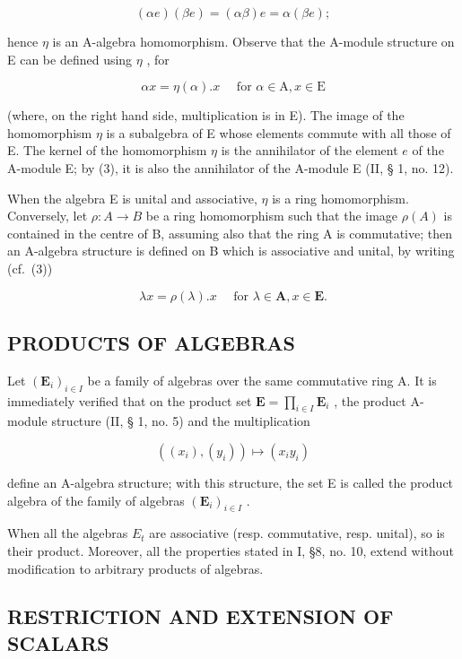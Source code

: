 \[
(\alpha e) (\beta e) = (\alpha \beta) e = \alpha (\beta e);
\]

hence \(\eta\) is an A-algebra homomorphism. Observe that the A-module structure on E can be defined using \(\eta\) , for

\[
\alpha x = \eta (\alpha). x \quad \text { for } \alpha \in \mathrm{A}, x \in \mathrm{E}\tag{3}
\]

(where, on the right hand side, multiplication is in E). The image of the homomorphism \(\eta\) is a subalgebra of E whose elements commute with all those of E. The kernel of the homomorphism \(\eta\) is the annihilator of the element \(e\) of the A-module E; by (3), it is also the annihilator of the A-module E (II, § 1, no. 12).

When the algebra E is unital and associative, \(\eta\) is a ring homomorphism. Conversely, let \(\rho:A\to B\) be a ring homomorphism such that the image \(\rho(A)\) is contained in the centre of B, assuming also that the ring A is commutative; then an A-algebra structure is defined on B which is associative and unital, by writing (cf.~(3))

\[
\lambda x = \rho (\lambda). x \quad \text { for } \lambda \in \mathbf {A}, x \in \mathbf {E}.
\]

\subsection{PRODUCTS OF ALGEBRAS}

Let \((\mathbf{E}_i)_{i\in I}\) be a family of algebras over the same commutative ring A. It is immediately verified that on the product set \(\mathbf{E} = \prod_{i\in I}\mathbf{E}_i\) , the product A-module structure (II, § 1, no. 5) and the multiplication

\[
\left(\left(x _ {i}\right), \left(y _ {i}\right)\right) \mapsto \left(x _ {i} y _ {i}\right)\tag{4}
\]

define an A-algebra structure; with this structure, the set E is called the product algebra of the family of algebras \((\mathbf{E}_{i})_{i\in I}\) .

When all the algebras \(E_{t}\) are associative (resp. commutative, resp. unital), so is their product. Moreover, all the properties stated in I, §8, no. 10, extend without modification to arbitrary products of algebras.

\subsection{RESTRICTION AND EXTENSION OF SCALARS}

